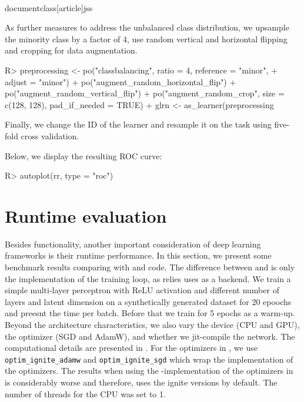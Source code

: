 \\documentclass[article]{jss}
\theoremstyle{definition}
\begin{document}
As further measures to address the unbalanced class distribution, we upsample the minority class by a factor of 4, use random vertical and horizontal flipping and cropping for data augmentation.

\begin{CodeInput}
R> preprocessing <- po("classbalancing", ratio = 4, reference = "minor",
+      adjust = "minor") %
+    po("augment_random_horizontal_flip") %
+    po("augment_random_vertical_flip") %
+    po("augment_random_crop", size = c(128, 128), pad_if_needed = TRUE)
+  glrn <- as_learner(preprocessing %
\end{CodeInput}

Finally, we change the ID of the learner and resample it on the task using five-fold cross validation.


Below, we display the resulting ROC curve:

\begin{CodeInput}
R> autoplot(rr, type = "roc")
\end{CodeInput}


\section{Runtime evaluation}\label{sec:benchmarks}

Besides functionality, another important consideration of deep learning frameworks is their runtime performance.
In this section, we present some benchmark results comparing \mlrttorch{} with \torch{} and \pytorch{} code.
The difference between \mlrttorch{} and \torch{} is only the implementation of the training loop, as \mlrttorch{} relies uses \torch{} as a backend.
We train a simple multi-layer perceptron with ReLU activation and different number of layers and latent dimension on a synthetically generated dataset for 20 epoochs and preesnt the time per batch.
Before that we train for 5 epochs as a warm-up.
Beyond the architecture characteristics, we also vary the device (CPU and GPU), the optimizer (SGD and AdamW), and whether we jit-compile the network.
The computational details are presented in .
For the optimizers in \rlang{}, we use \texttt{optim\_ignite\_adamw} and \texttt{optim\_ignite\_sgd} which wrap the \libtorch{} implementation of the optimizers.
The results when using the \rlang{}-implementation of the optimizers in \torch{} is considerably worse and therefore, \mlrttorch{} uses the ignite versions by default.
The number of threads for the CPU was set to 1.
\end{document}
